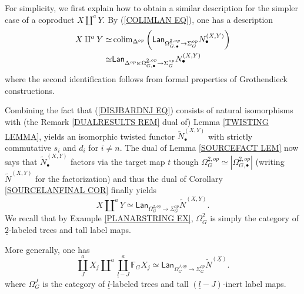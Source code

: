 \documentclass[a4paper,10pt]{article}%
\begin{document}
For simplicity, we first explain how to obtain a similar description for the simpler case of a coproduct $X \amalg^a Y$.
By (\ref{COLIMLAN EQ}), one has a description 
\begin{align*}
  X \amalg^a Y \simeq  &
  \operatorname{colim}_{\Delta^{op}}
  \left(
    \mathsf{Lan}_{\Omega_{G,\bullet}^{\underline{2},op} \to \Sigma_G^{op}}
    N_{\bullet}^{(X,Y)}
  \right)
  \\
  \simeq &
  \mathsf{Lan}_{\Delta^{op} \ltimes \Omega_{G,\bullet}^{\underline{2},op} \to \Sigma_G^{op}}
  N_{\bullet}^{(X,Y)}
\end{align*}
where the second identification follows from formal properties of Grothendieck constructions.

Combining the fact that (\ref{DISJBARDNJ EQ}) consists of natural isomorphisms with (the Remark \ref{DUALRESULTS REM} dual of) Lemma \ref{TWISTING LEMMA}, yields an isomorphic twisted functor $\tilde{N}_{\bullet}^{(X,Y)}$ with strictly commutative $s_i$ and $d_i$ for $i \neq n$. The dual of Lemma \ref{SOURCEFACT LEM} now says that $\tilde{N}_{\bullet}^{(X,Y)}$ factors via the target map $t$ though 
$\Omega_G^{\underline{2},op} \simeq
|\Omega_{G,\bullet}^{\underline{2},op}|$
(writing $\tilde{N}^{(X,Y)}$ for the factorization)
and thus the dual of 
Corollary \ref{SOURCELANFINAL COR}
finally yields
\begin{equation}
  X \amalg^a Y \simeq 
  \mathsf{Lan}_{\Omega_{G}^{\underline{2},op} \to \Sigma_G^{op}}
  \tilde{N}^{(X,Y)}.
\end{equation}
We recall that by Example \ref{PLANARSTRING EX}, $\Omega_{G}^{\underline{2}}$ is simply the category of $\underline{2}$-labeled trees and tall label maps.

More generally, one has 
\begin{equation}\label{LANCOPRODDESC}
  \coprod^a_{J} X_j \amalg^a \coprod^a_{\underline{l}-J}
  \mathbb{F}_G X_j \simeq 
  \mathsf{Lan}_{\Omega_{G}^{J,op} \to \Sigma_G^{op}}
  \tilde{N}^{(\underline{X})}.
\end{equation}
where $\Omega_{G}^{J}$ is the category of $\underline{l}$-labeled trees and tall $(\underline{l}-J)$-inert label maps.
\end{document}
